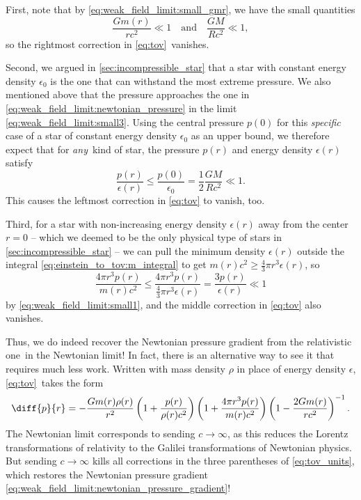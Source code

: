 First, note that by \cref{eq:weak_field_limit:small_gmr}, we have the small quantities
\begin{equation}
	\frac{Gm(r)}{rc^2} \ll 1
	\quad \text{and} \quad
	\frac{GM}{Rc^2} \ll 1 ,
	\label{eq:weak_field_limit:small3}
\end{equation}
so the rightmost correction in \cref{eq:tov} vanishes.

Second, we argued in \cref{sec:incompressible_star} that a star with constant energy density $\epsilon_0$ is the one that can withstand the most extreme pressure.
We also mentioned above that the pressure approaches the one in \cref{eq:weak_field_limit:newtonian_pressure} in the limit \eqref{eq:weak_field_limit:small3}.
Using the central pressure $p(0)$ for this \emph{specific} case of a star of constant energy density $\epsilon_0$ as an upper bound, we therefore expect that for \emph{any} kind of star, the pressure $p(r)$ and energy density $\epsilon(r)$ satisfy
\begin{equation}
	\frac{p(r)}{\epsilon(r)} \leq \frac{p(0)}{\epsilon_0} = \frac{1}{2} \frac{GM}{Rc^2} \ll 1 .
	\label{eq:weak_field_limit:small1}
\end{equation}
This causes the leftmost correction in \cref{eq:tov} to vanish, too.

Third, for a star with non-increasing energy density $\epsilon(r)$ away from the center $r=0$ -- which we deemed to be the only physical type of stars in \cref{sec:incompressible_star} -- we can pull the minimum density $\epsilon(r)$ outside the integral \eqref{eq:einstein_to_tov:m_integral} to get $m(r) c^2 \geq \frac{4}{3} \pi r^3 \epsilon(r)$, so
\begin{equation*}
	\frac{4 \pi r^3 p(r)}{m(r) c^2} \leq \frac{4 \pi r^3 p(r)}{\frac{4}{3} \pi r^3 \epsilon(r)}
	                                =    \frac{3 p(r)}{\epsilon(r)}
						            \ll  1
\end{equation*}
by \cref{eq:weak_field_limit:small1}, and the middle correction in \cref{eq:tov} also vanishes.

Thus, we do indeed recover the Newtonian pressure gradient from the relativistic one in the Newtonian limit!
In fact, there is an alternative way to see it that requires much less work.
Written with mass density $\rho$ in place of energy density $\epsilon$, \cref{eq:tov} takes the form
\begin{equation}
	\diff{p}{r} = -\frac{G m(r) \rho(r)}{r^2} \left( 1 + \frac{p(r)}{\rho(r) c^2} \right) \left( 1 + \frac{4 \pi r^3 p(r)}{m(r) c^2} \right) \left( 1 - \frac{2 G m(r)}{r c^2} \right)^{-1} .
	\label{eq:tov_units}
\end{equation}
The Newtonian limit corresponds to sending $c \rightarrow \infty$, as this reduces the Lorentz transformations of relativity to the Galilei transformations of Newtonian physics.
But sending $c \rightarrow \infty$ kills all corrections in the three parentheses of \cref{eq:tov_units}, which restores the Newtonian pressure gradient \eqref{eq:weak_field_limit:newtonian_pressure_gradient}!
